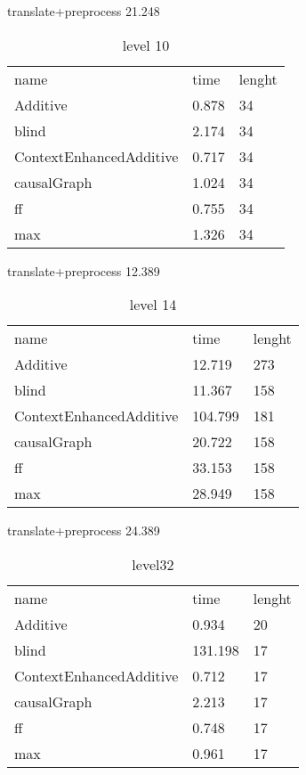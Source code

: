 	\begin{table}[h]
		\centering
		\caption{level 10}
		\label{prob4}
		translate+preprocess
		21.248\\
		\begin{tabular}{lll}
			
			
			name & time & lenght\\
			Additive & 0.878 & 34\\
			blind & 2.174 & 34\\
			ContextEnhancedAdditive & 0.717 & 34\\
			causalGraph & 1.024 & 34\\
			ff & 0.755 & 34\\
			max & 1.326 & 34\\
		\end{tabular}
	\end{table}
	\begin{table}[h]
		\centering
		\caption{level 14}
		\label{prob4}
		translate+preprocess
		12.389\\
		\begin{tabular}{lll}
			
			
			name & time & lenght\\
			Additive & 12.719 & 273\\
			blind & 11.367 & 158\\
			ContextEnhancedAdditive & 104.799 & 181\\
			causalGraph & 20.722 & 158\\
			ff & 33.153 & 158\\
			max & 28.949 & 158\\
		\end{tabular}
	\end{table}
	
	\begin{table}[h]
		\centering
		\caption{level32}
		\label{prob4}
		translate+preprocess
		24.389\\
		\begin{tabular}{lll}
			
			name & time & lenght\\
			Additive & 0.934 & 20\\
			blind & 131.198 & 17\\
			ContextEnhancedAdditive & 0.712 & 17\\
			causalGraph & 2.213 & 17\\
			ff & 0.748 & 17\\
			max & 0.961 & 17\\
		\end{tabular}
	\end{table}
